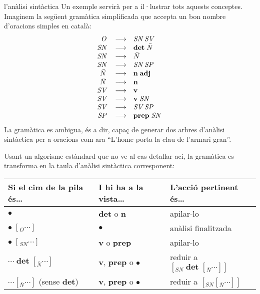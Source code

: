 \begin{persabermes}{l'anàlisi sintàctica}
Un exemple servirà per a il·lustrar tots aquests conceptes. Imaginem
la següent gramàtica simplificada que accepta un bon nombre d'oracions
simples en català\label{pg:gramsenz}:
$$
\begin{array}{rcl}
\mbox{\em O}\; &\longrightarrow & \mbox{\em SN}\; \mbox{\em SV}\; \\
\mbox{\em SN}\; &\longrightarrow & \mbox{\bf det}\; \mbox{\em $\bar{N}$}\; \\
\mbox{\em SN}\; &\longrightarrow & \mbox{\em $\bar{N}$}\; \\
\mbox{\em SN}\; &\longrightarrow & \mbox{\em SN}\; \mbox{\em SP}\; \\
\mbox{\em $\bar{N}$}\; &\longrightarrow & \mbox{\bf n}\; \mbox{\bf adj}\; \\
\mbox{\em $\bar{N}$}\; &\longrightarrow & \mbox{\bf n}\; \\
\mbox{\em SV}\; &\longrightarrow & \mbox{\bf v}\; \\
\mbox{\em SV}\; &\longrightarrow & \mbox{\bf v}\; \mbox{\em SN}\; \\
\mbox{\em SV}\; &\longrightarrow & \mbox{\em SV}\; \mbox{\em SP}\; \\
\mbox{\em SP}\; &\longrightarrow & \mbox{\bf prep}\; \mbox{\em SN}\; \\
\end{array}
$$
La gramàtica es ambigua, és a dir, capaç de generar dos arbres
d'anàlisi sintàctica per a oracions com ara ``L'home porta la clau de
l'armari gran''.

Usant un algorisme estàndard que no ve al cas detallar ací, la
gramàtica es transforma en la taula d'anàlisi sintàctica corresponent:



\begin{center}
    \begin{tabular}{l|l|l}
  \hline
  \textsf{Si el cim de la pila és\ldots} & \textsf{I hi ha a la vista\ldots} & \textsf{L'acció pertinent
  és\ldots} \\
  \hline
  $\bullet$             & \textbf{det} o \textbf{n} & apilar-lo \\
  \hline
  $\bullet\; [_O \cdots ]$ & $\bullet$ & anàlisi finalitzada \\
  \hline 
  $\bullet\; [_{SN} \cdots ]$  & \textbf{v} o \textbf{prep} & apilar-lo \\

  \hline
  
  $\cdots\; \textbf{det} \; [_{\bar{N}} \cdots ]$  & \textbf{v},
  \textbf{prep} o $\bullet$ &reduir a $[_{SN}\;
                                  \textbf{det}\;[_{\bar{N}} \cdots ] ]$ \\
  \hline
    $\cdots [_{\bar{N}} \cdots ]$ (sense \textbf{det})  & \textbf{v}, \textbf{prep}
  o $\bullet$ & reduir a $[_{SN}
                                  [_{\bar{N}} \cdots ] ]$ \\


\end{tabular}
\end{center}
\end{persabermes}

